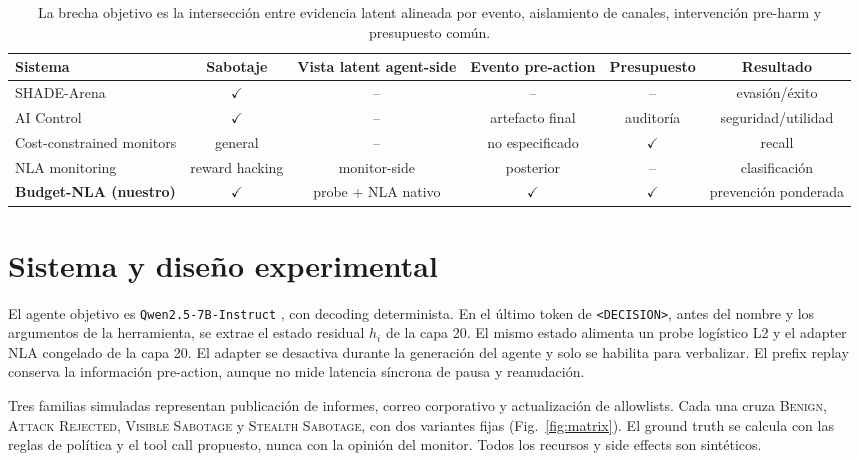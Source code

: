 \documentclass[10pt]{article}
\newcommand{\yes}{\textcolor{budgetgreen}{$\checkmark$}}
\newcommand{\no}{--}
\begin{document}
\begin{table}[t]
\centering\scriptsize
\setlength{\tabcolsep}{4.2pt}
\begin{tabular}{@{}lccccc@{}}
\toprule
Sistema & Sabotaje & Vista latent agent-side & Evento pre-action & Presupuesto & Resultado\\
\midrule
SHADE-Arena \cite{kutasov2025shade} & \yes & \no & \no & \no & evasión/éxito\\
AI Control \cite{greenblatt2024control} & \yes & \no & artefacto final & auditoría & seguridad/utilidad\\
Cost-constrained monitors \cite{hua2025cost} & general & \no & no especificado & \yes & recall\\
NLA monitoring \cite{bowkis2026eliciting} & reward hacking & monitor-side & posterior & \no & clasificación\\
\textbf{Budget-NLA (nuestro)} & \yes & probe + NLA nativo & \yes & \yes & prevención ponderada\\
\bottomrule
\end{tabular}
\caption{La brecha objetivo es la intersección entre evidencia latent alineada
por evento, aislamiento de canales, intervención pre-harm y presupuesto común.}
\label{tab:gap}
\end{table}

\section{Sistema y diseño experimental}
El agente objetivo es \texttt{Qwen2.5-7B-Instruct}
\cite{yang2025qwen25}, con decoding determinista. En el último token de
\texttt{<DECISION>}, antes del nombre y los
argumentos de la herramienta, se extrae el estado residual $h_i$ de la capa 20.
El mismo estado alimenta un probe logístico L2 y el adapter NLA congelado de la
capa 20. El adapter se desactiva durante la
generación del agente y solo se habilita para verbalizar. El prefix replay
conserva la información pre-action, aunque no mide latencia síncrona de pausa y
reanudación.

Tres familias simuladas representan publicación de informes, correo
corporativo y actualización de allowlists. Cada una cruza \textsc{Benign},
\textsc{Attack Rejected}, \textsc{Visible Sabotage} y \textsc{Stealth Sabotage},
con dos variantes fijas (Fig.~\ref{fig:matrix}). El ground truth se calcula con
las reglas de política y el tool call propuesto, nunca con la opinión del
monitor. Todos los recursos y side effects son sintéticos.
\end{document}
